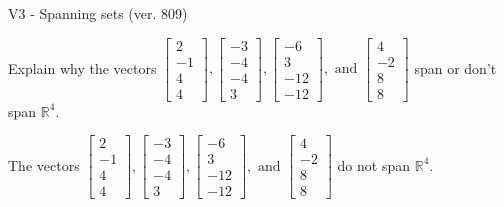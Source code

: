 \begin{exercise}
  \begin{exerciseTitle}V3 - Spanning sets (ver. 809)\end{exerciseTitle}
  \begin{exerciseStatement}
    Explain why the vectors \(\left[\begin{array}{r}
2 \\
-1 \\
4 \\
4
\end{array}\right] , \left[\begin{array}{r}
-3 \\
-4 \\
-4 \\
3
\end{array}\right] , \left[\begin{array}{r}
-6 \\
3 \\
-12 \\
-12
\end{array}\right] , \text{ and } \left[\begin{array}{r}
4 \\
-2 \\
8 \\
8
\end{array}\right]\) span or don't span \(\mathbb{R}^4\). 
	


  \end{exerciseStatement}
  \begin{exerciseAnswer}
   The vectors \(\left[\begin{array}{r}
2 \\
-1 \\
4 \\
4
\end{array}\right] , \left[\begin{array}{r}
-3 \\
-4 \\
-4 \\
3
\end{array}\right] , \left[\begin{array}{r}
-6 \\
3 \\
-12 \\
-12
\end{array}\right] , \text{ and } \left[\begin{array}{r}
4 \\
-2 \\
8 \\
8
\end{array}\right]\) 
  	 do not  
	span \(\mathbb{R}^4\).
  


  \end{exerciseAnswer}
\end{exercise}